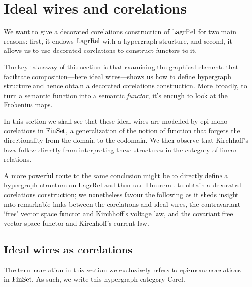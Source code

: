 \section{Ideal wires and corelations} \label{sec:corel}
We want to give a decorated corelations construction of $\mathrm{LagrRel}$ for two main
reasons: first, it endows $\mathrm{LagrRel}$ with a hypergraph structure, and second, it
allows us to use decorated corelations to construct functors to it.  

The key takeaway of this section is that examining the graphical elements that
facilitate composition---here ideal wires---shows us how to define hypergraph
structure and hence obtain a decorated corelations construction. More broadly,
to turn a semantic function into a semantic \emph{functor}, it's enough to look
at the Frobenius maps.

In this section we shall see that these ideal wires are modelled by epi-mono
corelations in $\mathrm{FinSet}$, a generalization of the notion of function that
forgets the directionality from the domain to the codomain. We then observe
that Kirchhoff's laws follow directly from interpreting these structures in the
category of linear relations.

A more powerful route to the same conclusion might be to directly define a
hypergraph structure on $\mathrm{LagrRel}$ and then use Theorem . to obtain a
decorated corelations construction; we nonetheless favour the following as it
sheds insight into remarkable links between the corelations and ideal wires, the
contravariant `free' vector space functor and Kirchhoff's voltage law, and the
covariant free vector space functor and Kirchhoff's current law. 

\subsection{Ideal wires as corelations}

The term corelation in this section we exclusively refers to epi-mono corelations
in $\mathrm{FinSet}$. As such, we write this hypergraph category $\mathrm{Corel}$. 

